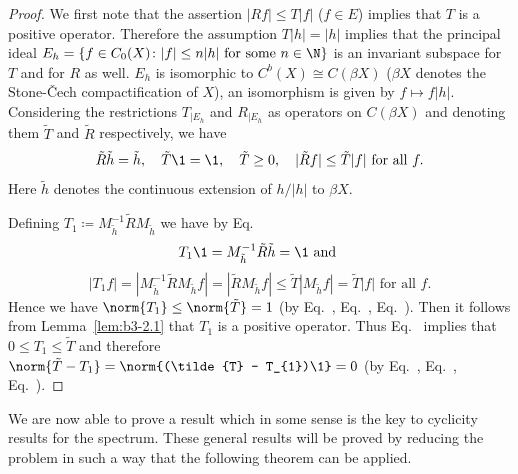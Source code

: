 \begin{proof}
	We first note that the assertion $|Rf| \leq T|f|$ ($f \in E$) implies that $T$ is a positive operator.
	Therefore the assumption $T|h| = |h|$ implies that the principal ideal $E_{h} = \{f \in C_{0}(X) \colon |f| \leq n|h| \text{ for some } n \in \N\}$ is an invariant subspace for $T$ and for $R$ as well.
	$E_{h}$ is isomorphic to $C^{b}(X) \cong C(\beta X)$ ($\beta X$ denotes the Stone-Čech compactification of\/ $X$), an isomorphism is given by $f \mapsto f|h|$.
	Considering the restrictions $T_{|E_{h}}$ and $R_{|E_{h}}$ as operators on $C(\beta X)$ and denoting them $\tilde{T}$ and $\tilde{R}$ respectively, we have
\begin{equation}\label{eq:b3-2.9}
		\tilde{R}\tilde{h} = \tilde{h}, \quad \tilde{T}\1 = \1, \quad \tilde{T} \geq 0, \quad |\tilde{R}f| \leq \tilde{T}|f| \text{ for all } f.
	\end{equation}
	Here $\tilde{h}$ denotes the continuous extension of\/ $h/|h|$ to $\beta X$.
	
	Defining $T_{1} \coloneqq M_{\tilde{h}}^{-1}\tilde{R}M_{\tilde{h}}$ we have by Eq.~
	\begin{equation}\label{eq:b3-2.10}
	T_{1}\1 = M_{\tilde{h}}^{-1}\tilde{R}\tilde{h} = \1 \text{ and }
	\end{equation}
	\begin{equation}\label{eq:b3-2.11}
	|T_{1}f| = |M_{\tilde{h}}^{-1}\tilde{R}M_{\tilde{h}}f| = |\tilde{R}M_{\tilde{h}}f| \leq \tilde{T}|M_{\tilde{h}}f| = \tilde{T}|f| \text{ for all } f.
	\end{equation}
	Hence we have $\norm{T_{1}} \leq \norm{\tilde{T}} = 1$ (by Eq.~, Eq.~, Eq.~).
	Then it follows from Lemma~\ref{lem:b3-2.1} that $T_{1}$ is a positive operator.
	Thus Eq.~ implies that $0 \leq T_{1} \leq \tilde{T}$ and therefore $\norm{\tilde{T} - T_{1}} = \norm{(\tilde{T} - T_{1})\1} = 0$ (by Eq.~, Eq.~, Eq.~).
\end{proof}
We are now able to prove a result which in some sense is the key to cyclicity results for the spectrum.
	These general results will be proved by reducing the problem in such a way that the following theorem can be applied.
